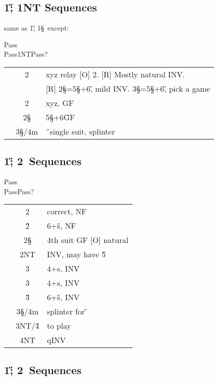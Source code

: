 \subsection{1\H; 1NT Sequences}

same as 1\H; 1\S\ except:
\begin{bidding}
\>\D\>Pass\H\\
\>Pass\>1NT\>Pass\>?\\
\end{bidding}

\begin{longtable}{C{\linklength} C{\bidlength} l}
& 2\C & xyz relay [O] 2\D. [R] Mostly natural INV. \\
&     & [R] 2\S=5\S+6\H, mild INV. 3\S=5\S+6\H, pick a game \\
& 2\D & xyz, GF \\
& 2\S & 5\S+6\H GF \\
& 3\S/4m & \H\ single suit, splinter \\
\end{longtable}

\subsection{1\H; 2\C\ Sequences}

\begin{bidding}
\>\D\>Pass\H\\
\>Pass\C\>Pass\>?\\
\end{bidding}

\begin{longtable}{C{\linklength} C{\bidlength} l}
& 2\D & correct, NF \\
& 2\H & 6+\H s, NF \\
& 2\S &4th suit GF [O] natural \\
& 2NT & INV, may have 5\H \\
& 3\C & 4+\C s, INV \\
& 3\D & 4+\D s, INV \\
& 3\H & 6+\H s, INV \\
& 3\S/4m & splinter for \H \\
& 3NT/4\H & to play\\
& 4NT & qINV
\end{longtable}

\subsection{1\H; 2\D\ Sequences}

